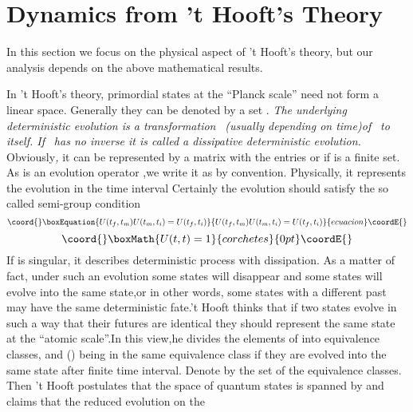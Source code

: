 \documentclass[a4paper,12pt]{article}
\begin{document}
\section{Dynamics from 't Hooft's Theory}

In this section we focus on the physical aspect of 't Hooft's theory, but
our analysis depends on the above mathematical results.

In 't Hooft's theory, primordial states at the ``Planck scale'' need not
form a linear space. Generally they can be denoted by a set \myHighlight{$\Sigma $}\coordHE{}  \coordHE{}. \textit{The underlying deterministic evolution is a
transformation }\coordHE{}\textit{\ (usually depending on time)of }\myHighlight{$\Sigma $}\coordHE{}\textit{%
\ to itself. If }\coordHE{}\textit{\ has no inverse it is called a dissipative
deterministic evolution. }Obviously\textit{, }it can be represented by a
matrix with the entries \coordHE{} or \coordHE{} if \coordHE{} is a finite set. As \coordHE{} is an
evolution operator ,we write it as \coordHE{} by convention.
Physically, it represents the evolution in the time interval \coordHE{}
Certainly the evolution should satisfy the so called semi-group condition
\begin{equation}\coord{}\boxEquation{
U(t_f,t_m)U(t_m,t_i)=U(t_f,t_i)
}{
U(t_f,t_m)U(t_m,t_i)=U(t_f,t_i)
}{ecuacion}\coordE{}\end{equation}
\[\coord{}\boxMath{
U(t,t)=1
}{corchetes}{0pt}\coordE{}\]
If \coordHE{} is singular, it describes deterministic process with dissipation. As
a matter of fact, under such an evolution some states will disappear and
some states will evolve into the same state,or in other words, some states
with a different past may have the same deterministic fate.'t Hooft thinks
that if two states evolve in such a way that their futures are identical
they should represent the same state at the ``atomic scale''.In this view,he
divides the elements of \myHighlight{$\Sigma $}\coordHE{} into equivalence classes, \coordHE{}
and \coordHE{} (\coordHE{}) being in the same equivalence class if
they are evolved into the same state after finite time interval. Denote by \coordHE{} the set of the equivalence classes. Then
't Hooft postulates that the space of quantum states is spanned by \coordHE{} and claims that the reduced evolution on the
\end{document}

